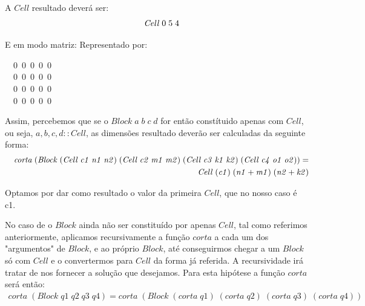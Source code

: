 \documentclass[a4paper]{article}
\newcommand{\Conid}[1]{\mathit{#1}}
\newcommand{\Varid}[1]{\mathit{#1}}
\begin{document}
\begin{enumerate}
A \ensuremath{\Conid{Cell}} resultado deverá ser:
\begin{eqnarray*}
\start
\ensuremath{\Conid{Cell}\;\mathrm{0}\;\mathrm{5}\;\mathrm{4}}
\end{eqnarray*}

E em modo matriz:
Representado por:
\begin{tabbing}\ttfamily
~~0~0~0~0~0~\\
\ttfamily ~~0~0~0~0~0~\\
\ttfamily ~~0~0~0~0~0~\\
\ttfamily ~~0~0~0~0~0~
\end{tabbing}

Assim, percebemos que se o \ensuremath{\Conid{Block}\;\Varid{a}\;\Varid{b}\;\Varid{c}\;\Varid{d}} for então constítuido apenas com \ensuremath{\Conid{Cell}},
ou seja, \ensuremath{\Varid{a},\Varid{b},\Varid{c},\Varid{d}\mathbin{::}\Conid{Cell}}, as dimensões resultado deverão ser calculadas da seguinte
forma:
\begin{eqnarray*}
\start
       \ensuremath{\Varid{corta}\;(\Conid{Block}\;(\Conid{Cell}\;\Varid{c1}\;\Varid{n1}\;\Varid{n2})\;(\Conid{Cell}\;\Varid{c2}\;\Varid{m1}\;\Varid{m2})\;(\Conid{Cell}\;\Varid{c3}\;\Varid{k1}\;\Varid{k2})\;(\Conid{Cell}\;\Varid{c4}\;\Varid{o1}\;\Varid{o2}))\mathrel{=}}
\more
        \ensuremath{\Conid{Cell}\;(\Varid{c1})\;(\Varid{n1}\mathbin{+}\Varid{m1})\;(\Varid{n2}\mathbin{+}\Varid{k2})}
\end{eqnarray*}

Optamos por dar como resultado o valor da primeira \ensuremath{\Conid{Cell}}, que no nosso caso é c1.


No caso de o \ensuremath{\Conid{Block}} ainda não ser constituído por apenas \ensuremath{\Conid{Cell}}, tal como referimos
anteriormente, aplicamos recursivamente a função \ensuremath{\Varid{corta}} a cada um dos "argumentos"
de \ensuremath{\Conid{Block}}, e ao próprio \ensuremath{\Conid{Block}}, até conseguirmos chegar a um \ensuremath{\Conid{Block}} só com
\ensuremath{\Conid{Cell}} e o convertermos para \ensuremath{\Conid{Cell}} da forma já referida.
A recursividade irá tratar de nos fornecer a solução que desejamos.
Para esta hipótese a função \ensuremath{\Varid{corta}} será então:
\begin{eqnarray*}
       \ensuremath{\Varid{corta}\;(\Conid{Block}\;\Varid{q1}\;\Varid{q2}\;\Varid{q3}\;\Varid{q4})\mathrel{=}\Varid{corta}\;(\Conid{Block}\;(\Varid{corta}\;\Varid{q1})\;(\Varid{corta}\;\Varid{q2})\;(\Varid{corta}\;\Varid{q3})\;(\Varid{corta}\;\Varid{q4}))}
\end{eqnarray*}


\end{enumerate}
\end{document}
